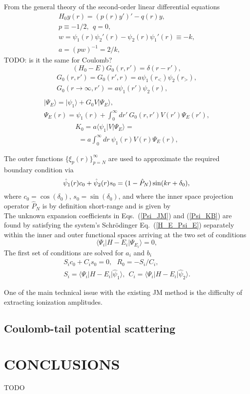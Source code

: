 \documentclass[aip
, pra
, showpacs
, aps
, twocolumn
, groupedaddress
, floatfix
]{revtex4}
\newcommand{\beq}{\begin{equation}}
\newcommand{\eeq}{\end{equation}}
\newcommand{\barr}{\begin{array}}
\newcommand{\earr}{\end{array}}
\begin{document}
From the general theory of the second-order linear differential equations
\beq \barr{l}
H_0 y(r) = (p(r) y')' - q(r) y,\\
p \equiv -1/2, \ \ q = 0,\\
w = \psi_1(r) \psi_2'(r) - \psi_2(r) \psi_1'(r) \equiv -k,\\
a = (pw)^{-1}= 2/k,
\earr \eeq
TODO: is it the same for Coulomb?
\beq
(H_0 - E) G_0(r,r') = \delta(r-r'), 
\eeq
\beq \barr{l}
G_0(r,r') = G_0(r',r) = a \psi_1(r_{<}) \psi_2(r_{>}), \\
G_0(r \rightarrow \infty,r') = a \psi_1(r') \psi_2(r), \\
\earr \eeq
\beq \barr{l}
| \Psi_E \rangle = | \psi_1 \rangle + G_0 V |\Psi_E \rangle,\\
\Psi_E(r) = \psi_1(r) +  \int_0^\infty dr'\ G_0(r,r') V(r') \Psi_E(r'),
\earr \eeq
\beq \barr{l}
K_0 = a \langle \psi_1 | V | \Psi_E \rangle =\\
\ \ = a \int_0^\infty  dr\ \psi_1(r) V(r) \Psi_E(r),
\earr \eeq


The outer functions $\{\xi_p(r)\}_{p=N}^\infty$ are used to approximate the required boundary condition via
\beq
\hat{\psi}_1(r) c_0 + \hat{\psi}_2(r) s_0 =
(1-\hat{P}_N) \sin(kr + \delta_0),\\
\eeq
where $c_0 = \cos(\delta_0)$, $s_0 = \sin(\delta_0)$,
and where the inner space projection operator $\hat{P}_N$ is by definition short-range and is given by \\


The unknown expansion coefficients in Eqs.~(\ref{Psi_JM}) and (\ref{Psi_KB})
are found by satisfying the system's  Schr\"odinger Eq.~(\ref{H_E_Psi_E})
separately within the inner and outer functional spaces
arriving at the two set of conditions
\beq
\langle\Psi_i|H-E_i|\Psi_{E_i}\rangle=0,
\eeq
The first set of conditions are solved for $a_i$ and $b_i$
\beq \barr{l}
S_i c_0 + C_i s_0 = 0, \ \ \
R_0 = - S_i / C_i, \\
S_i = \langle\Psi_i|H-E_i|  \hat{\psi}_1 \rangle, \ \
C_i = \langle\Psi_i|H-E_i|  \hat{\psi}_2 \rangle.
\earr \eeq




One of the main technical issue with the existing JM method is the difficulty of extracting ionization amplitudes.


\subsection{Coulomb-tail potential scattering}



\section{CONCLUSIONS}
TODO


\begin{acknowledgments}
\end{acknowledgments}





%
\end{document}
